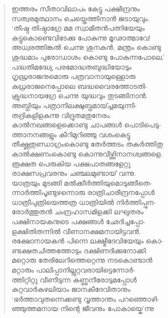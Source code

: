 \begin{verse}
ഇത്തരം സീതാവിലാപം കേട്ടു പക്ഷീന്ദ്രനും\\
സത്വരമുത്ഥാനം ചെയ്തെത്തിനാന്‍ ജടായുവും.\\
‘തിഷ്ഠ തിഷ്ഠാഗ്രേ മമ സ്വാമിതന്‍പത്നിയേയും\\
കട്ടുകൊണ്ടെവിടേക്കു പോകുന്നു മൂഢാത്മാവേ!\\
അധ്വരത്തിങ്കല്‍ ചെന്നു ശുനകന്‍, മന്ത്രം കൊണ്ടു\\
ശുദ്ധമാം പുരോഡാശം കൊണ്ടു പോകുന്നപോലെ.’\\
പദ്ധതിമദ്ധ്യേ പരമോദ്ധതബുദ്ധിയോടും\\
ഗൃദ്ധ്രരാജനുമൊരു പത്രവാനായുള്ളൊരു\\
കുധ്രരാജനെപ്പോലെ ബദ്ധവൈരത്തോടതി-\\
ക്രുദ്ധനായഗ്രേ ചെന്നു യുദ്ധവും തുടങ്ങിനാന്‍.\\
അബ്ധിയും പത്രാനിലക്ഷുബ്ധമായ്ച്ചമയുന്നി-\\
തദ്രികളിളകുന്നു വിദ്രുതമതുനേരം.\\
കാല്‍നഖങ്ങളെക്കൊണ്ടു ചാപങ്ങള്‍ പൊടിപെടു-\\
ത്താനനങ്ങളും കീറിമുറിഞ്ഞു വശംകെട്ടു\\
തീക്ഷ്ണതുണ്ഡാഗ്രംകൊണ്ടു തേര്‍ത്തടം തകര്‍ത്തിതു\\
കാല്‍ക്ഷണംകൊണ്ടു കൊന്നുവീഴ്ത്തിനാനശ്വങ്ങളെ.\\
രൂക്ഷത പെരുകിയ പക്ഷപാതങ്ങളേറ്റു\\
രാക്ഷസപ്രവരനും ചഞ്ചലമുണ്ടായ് വന്നു.\\
യാത്രയും മുടങ്ങി മല്‍ക്കീര്‍ത്തിയുമൊടുങ്ങീതെ-\\
ന്നാര്‍ത്തിപൂണ്ടുഴന്നൊരു രാത്രിചാരീന്ദ്രനപ്പോള്‍\\
ധാത്രീപുത്രിയെത്തത്ര ധാത്രിയില്‍ നിര്‍ത്തിപ്പുന-\\
രോര്‍ത്തുതന്‍ ചംന്ദ്രഹാസമിളക്കി ലഘുതരം\\
പക്ഷിനായകനുടെ പക്ഷങ്ങള്‍ ഛേദിച്ചപ്പോ-\\
ളക്ഷിതിതന്നില്‍ വീണാനക്ഷമനായിട്ടവന്‍.\\
രക്ഷോനായകന്‍ പിന്നെ ലക്ഷ്മീദേവിയേയും കൊ-\\
ണ്ടക്ഷതചിത്തത്തോടും ദക്ഷിണദിക്കുനോക്കി\\
മറ്റൊരു തേരിലേറിത്തെറ്റെന്നു നടകൊണ്ടാന്‍\\
മറ്റാരും പാലിപ്പാനില്ലുറ്റവരായിട്ടെന്നോര്‍-\\
ത്തിറ്റിറ്റു വീണീടുന്ന കണ്ണുനീരോടുമപ്പോള്‍\\
കറ്റവാര്‍കുഴലിയാം ജാനകീദേവിതാനും\\
‘ഭര്‍ത്താവുതന്നെക്കണ്ടു വൃത്താന്തം പറഞ്ഞൊഴി-\\
ഞ്ഞുത്തമനായ നിന്റെ ജീവനും പോകായ്കെ’ന്നു\\

\end{verse}
